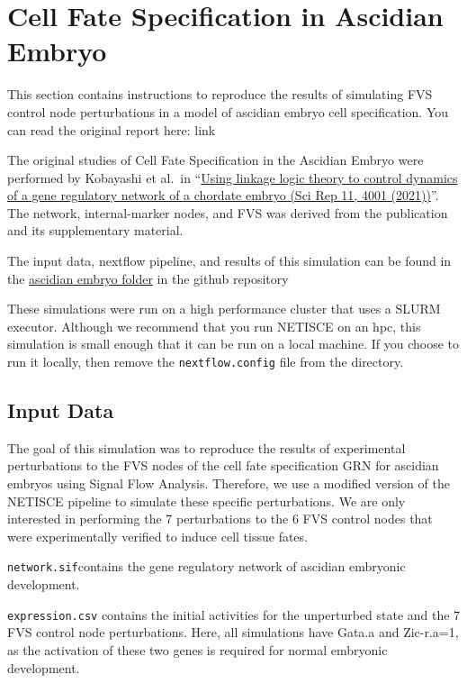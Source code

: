 \documentclass[
]{book}
\begin{document}
\hypertarget{cell-fate-specification-in-ascidian-embryo}{%
\chapter{Cell Fate Specification in Ascidian Embryo}\label{cell-fate-specification-in-ascidian-embryo}}

This section contains instructions to reproduce the results of simulating FVS control node perturbations in a model of ascidian embryo cell specification. You can read the original report here: link

The original studies of Cell Fate Specification in the Ascidian Embryo were performed by Kobayashi et al.~in ``\href{https://www.nature.com/articles/s41598-021-83045-y}{Using linkage logic theory to control dynamics of a gene regulatory network of a chordate embryo (Sci Rep 11, 4001 (2021))}''. The network, internal-marker nodes, and FVS was derived from the publication and its supplementary material.

The input data, nextflow pipeline, and results of this simulation can be found in the \href{https://github.com/VeraLiconaResearchGroup/Netisce/tree/main/ascidian_embryo_validation}{ascidian embryo folder} in the github repository

These simulations were run on a high performance cluster that uses a SLURM executor. Although we recommend that you run NETISCE on an hpc, this simulation is small enough that it can be run on a local machine. If you choose to run it locally, then remove the \texttt{nextflow.config} file from the directory.

\hypertarget{input-data}{%
\section{Input Data}\label{input-data}}

The goal of this simulation was to reproduce the results of experimental perturbations to the FVS nodes of the cell fate specification GRN for ascidian embryos using Signal Flow Analysis. Therefore, we use a modified version of the NETISCE pipeline to simulate these specific perturbations.
We are only interested in performing the 7 perturbations to the 6 FVS control nodes that were experimentally verified to induce cell tissue fates.

\texttt{network.sif}contains the gene regulatory network of ascidian embryonic development.

\texttt{expression.csv} contains the initial activities for the unperturbed state and the 7 FVS control node perturbations. Here, all simulations have Gata.a and Zic-r.a=1, as the activation of these two genes is required for normal embryonic development.
\end{document}
